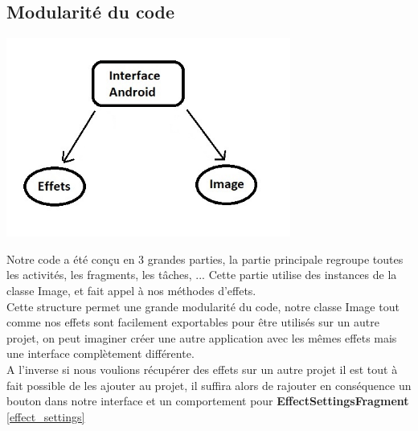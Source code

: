 \subsection{Modularité du code}
\begin{center}
    \includegraphics[width=0.7\textwidth]{report_src/structure.jpg}
\end{center}
Notre code a été conçu en 3 grandes parties, la partie principale regroupe toutes les activités, les fragments, les tâches, ... Cette partie utilise des instances de la classe Image, et fait appel à nos méthodes d'effets.
\\

Cette structure permet une grande modularité du code, notre classe Image tout comme nos effets sont facilement exportables pour être utilisés sur un autre projet, on peut imaginer créer une autre application avec les mêmes effets mais une interface complètement différente.
\\
A l'inverse si nous voulions récupérer des effets sur un autre projet il est tout à fait possible de les ajouter au projet, il suffira alors de rajouter en conséquence un bouton dans notre interface et un comportement pour \textbf{EffectSettingsFragment} \ref{effect_settings}
